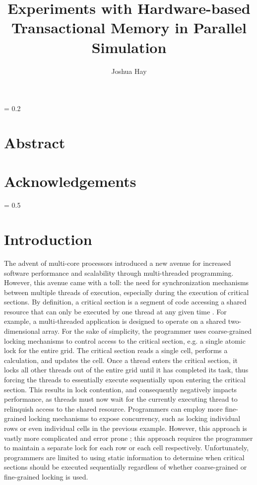 \documentclass[a4paper]{article}
\title{
    \vspace{2in}
    \textbf{Experiments with Hardware-based Transactional Memory in Parallel
    Simulation \\}
    \vspace{2in}
}
\author{Joshua Hay}
\affil{hayja@mail.uc.edu}
\affil{(513) 607-4929}
\begin{document}
%
\maketitle
\thispagestyle{empty}
\newpage
\thispagestyle{empty}
\parskip = 0.2\baselineskip
\newpage
\thispagestyle{empty}
\section*{\textbf{Abstract}}
\newpage
\thispagestyle{empty}
\section*{\textbf{Acknowledgements}}
\newpage
\thispagestyle{empty}
\tableofcontents
\newpage
\thispagestyle{empty}
\listoffigures
\listoftables
\parskip = 0.5\baselineskip
\newpage

\section{\textbf{Introduction}}

\indent 
The advent of multi-core processors introduced a new avenue for increased
software performance and scalability through multi-threaded programming.
However, this avenue came with a toll: the need for synchronization mechanisms
between multiple threads of execution, especially during the execution of
critical sections.  By definition, a critical section is a segment of code
accessing a shared resource that can only be executed by one thread at any given
time \cite{os_concepts}.  For example, a multi-threaded application is designed
to operate on a shared two-dimensional array.  For the sake of simplicity, the
programmer uses coarse-grained locking mechanisms to control access to the
critical section, e.g. a single atomic lock for the entire grid.  The critical
section reads a single cell, performs a calculation, and updates the cell.  Once
a thread enters the critical section, it locks all other threads out of the
entire grid until it has completed its task, thus forcing the threads to
essentially execute sequentially upon entering the critical section.  This
results in lock contention, and consequently negatively impacts performance, as
threads must now wait for the currently executing thread to relinquish access to
the shared resource.  Programmers can employ more fine-grained locking
mechanisms to expose concurrency, such as locking individual rows or even
individual cells in the previous example.  However, this approach is vastly more
complicated and error prone \cite{sle_rajwar}; this approach requires the
programmer to maintain a separate lock for each row or each cell respectively.
Unfortunately, programmers are limited to using static information to determine
when critical sections should be executed sequentially regardless of whether
coarse-grained or fine-grained locking is used.
\par
\end{document}
